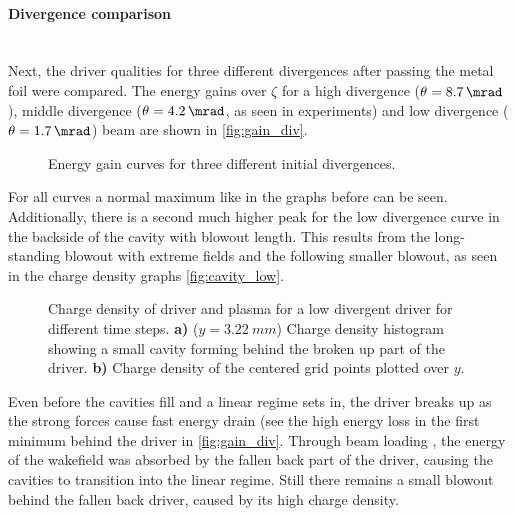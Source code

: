 \documentclass[bachelor_thesis]{subfiles}
\begin{document}
\paragraph*{Divergence comparison}\label{para:div_comp}\hspace{0pt} \\
Next, the driver qualities for three different divergences after passing the metal foil were compared. The energy gains over $\zeta$ for a high divergence ($\theta=\qty{8.7}{\mrad}$), middle divergence ($\theta=\qty{4.2}{\mrad}$, as seen in experiments) 
and low divergence ($\theta=\qty{1.7}{\mrad}$) beam are shown in \autoref{fig:gain_div}.
\begin{figure}
	\centering
	\missingfigure{}
	\caption{Energy gain curves for three different initial divergences.}
	\label{fig:gain_div}
\end{figure}
For all curves a normal maximum like in the graphs before can be seen. Additionally, there is a second much higher peak for the low divergence curve in the backside of the cavity with blowout length.
This results from the long-standing blowout with extreme fields and the following smaller blowout, as seen in the charge density graphs \autoref{fig:cavity_low}.

\begin{figure}
	\centering
	\missingfigure{}
	\caption{Charge density of driver and plasma for a low divergent driver for different time steps.
	\textbf{a)} ($y=\qty{3.22}{mm}$) Charge density histogram showing a small cavity forming behind the broken up part of the driver.
	\textbf{b)} Charge density of the centered grid points plotted over $y$. 
	}
	\label{fig:cavity_low}
\end{figure}
Even before the cavities fill and a linear regime sets in, the driver breaks up as the strong forces cause fast energy drain (see the high energy loss in the first minimum behind the driver in \autoref{fig:gain_div}.
Through beam loading \cite{Kirchen2021, Goetzfried2020}, the energy of the wakefield was absorbed by the fallen back part of the driver, causing the cavities to transition into the linear regime. 
Still there remains a small blowout behind the  fallen back driver, caused by its high charge density.
\end{document}
